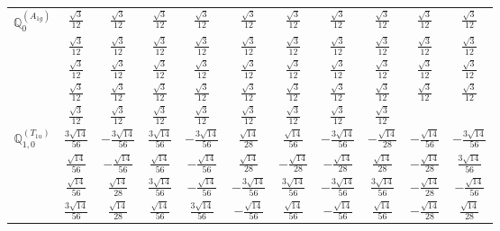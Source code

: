 \documentclass[fleqn,10pt,landscape]{article}
\begin{document}
\begin{itemize}
{\begin{center}
\begin{longtable}{ccccccccccc}
$\mathbb{Q}_{0}^{(A_{1g})}$ & $ \frac{\sqrt{3}}{12} $ & $ \frac{\sqrt{3}}{12} $ & $ \frac{\sqrt{3}}{12} $ & $ \frac{\sqrt{3}}{12} $ & $ \frac{\sqrt{3}}{12} $ & $ \frac{\sqrt{3}}{12} $ & $ \frac{\sqrt{3}}{12} $ & $ \frac{\sqrt{3}}{12} $ & $ \frac{\sqrt{3}}{12} $ & $ \frac{\sqrt{3}}{12} $ \\
& $ \frac{\sqrt{3}}{12} $ & $ \frac{\sqrt{3}}{12} $ & $ \frac{\sqrt{3}}{12} $ & $ \frac{\sqrt{3}}{12} $ & $ \frac{\sqrt{3}}{12} $ & $ \frac{\sqrt{3}}{12} $ & $ \frac{\sqrt{3}}{12} $ & $ \frac{\sqrt{3}}{12} $ & $ \frac{\sqrt{3}}{12} $ & $ \frac{\sqrt{3}}{12} $ \\
& $ \frac{\sqrt{3}}{12} $ & $ \frac{\sqrt{3}}{12} $ & $ \frac{\sqrt{3}}{12} $ & $ \frac{\sqrt{3}}{12} $ & $ \frac{\sqrt{3}}{12} $ & $ \frac{\sqrt{3}}{12} $ & $ \frac{\sqrt{3}}{12} $ & $ \frac{\sqrt{3}}{12} $ & $ \frac{\sqrt{3}}{12} $ & $ \frac{\sqrt{3}}{12} $ \\
& $ \frac{\sqrt{3}}{12} $ & $ \frac{\sqrt{3}}{12} $ & $ \frac{\sqrt{3}}{12} $ & $ \frac{\sqrt{3}}{12} $ & $ \frac{\sqrt{3}}{12} $ & $ \frac{\sqrt{3}}{12} $ & $ \frac{\sqrt{3}}{12} $ & $ \frac{\sqrt{3}}{12} $ & $ \frac{\sqrt{3}}{12} $ & $ \frac{\sqrt{3}}{12} $ \\
& $ \frac{\sqrt{3}}{12} $ & $ \frac{\sqrt{3}}{12} $ & $ \frac{\sqrt{3}}{12} $ & $ \frac{\sqrt{3}}{12} $ & $ \frac{\sqrt{3}}{12} $ & $ \frac{\sqrt{3}}{12} $ & $ \frac{\sqrt{3}}{12} $ & $ \frac{\sqrt{3}}{12} $ & $  $ & $  $ \\ \hline
$\mathbb{Q}_{1,0}^{(T_{1u})}$ & $ \frac{3 \sqrt{14}}{56} $ & $ - \frac{3 \sqrt{14}}{56} $ & $ \frac{3 \sqrt{14}}{56} $ & $ - \frac{3 \sqrt{14}}{56} $ & $ \frac{\sqrt{14}}{28} $ & $ \frac{\sqrt{14}}{56} $ & $ - \frac{3 \sqrt{14}}{56} $ & $ - \frac{\sqrt{14}}{28} $ & $ - \frac{\sqrt{14}}{56} $ & $ - \frac{3 \sqrt{14}}{56} $ \\
& $ \frac{\sqrt{14}}{56} $ & $ - \frac{\sqrt{14}}{56} $ & $ \frac{\sqrt{14}}{56} $ & $ - \frac{\sqrt{14}}{56} $ & $ \frac{\sqrt{14}}{28} $ & $ - \frac{\sqrt{14}}{28} $ & $ - \frac{\sqrt{14}}{28} $ & $ \frac{\sqrt{14}}{28} $ & $ - \frac{\sqrt{14}}{28} $ & $ \frac{3 \sqrt{14}}{56} $ \\
& $ \frac{\sqrt{14}}{56} $ & $ \frac{\sqrt{14}}{28} $ & $ \frac{3 \sqrt{14}}{56} $ & $ - \frac{\sqrt{14}}{56} $ & $ - \frac{3 \sqrt{14}}{56} $ & $ \frac{3 \sqrt{14}}{56} $ & $ - \frac{3 \sqrt{14}}{56} $ & $ \frac{3 \sqrt{14}}{56} $ & $ - \frac{\sqrt{14}}{28} $ & $ - \frac{\sqrt{14}}{56} $ \\
& $ \frac{3 \sqrt{14}}{56} $ & $ \frac{\sqrt{14}}{28} $ & $ \frac{\sqrt{14}}{56} $ & $ \frac{3 \sqrt{14}}{56} $ & $ - \frac{\sqrt{14}}{56} $ & $ \frac{\sqrt{14}}{56} $ & $ - \frac{\sqrt{14}}{56} $ & $ \frac{\sqrt{14}}{56} $ & $ - \frac{\sqrt{14}}{28} $ & $ \frac{\sqrt{14}}{28} $ \\

\end{longtable}
\end{center}}
\end{itemize}
\end{document}
